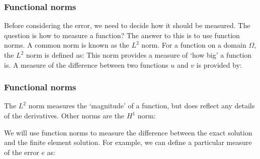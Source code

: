 \documentclass[notes]{beamer}
\begin{document}
\begin{frame}
\frametitle{Functional norms}
Before considering the error, we need to decide how it should be measured. The question
is how to measure a function? The answer to this is to use function norms. A common
norm is known as the $L^2$ norm. For a function on a domain $\Omega$, the $L^2$ norm is defined
as:
This norm provides a measure of ‘how big’ a function is. A measure of the difference
between two functions $u$ and $v$ is provided by:
\end{frame}

\begin{frame}
\frametitle{Functional norms}
The $L^2$ norm measures the `magnitude' of a function, but does reflect any details of
the derivatives. Other norms are the $H^1$ norm:

We will use function norms to measure the difference between the exact solution and
the finite element solution. For example, we can define a particular measure of the error
$e$ as:
\end{frame}
\end{document}
